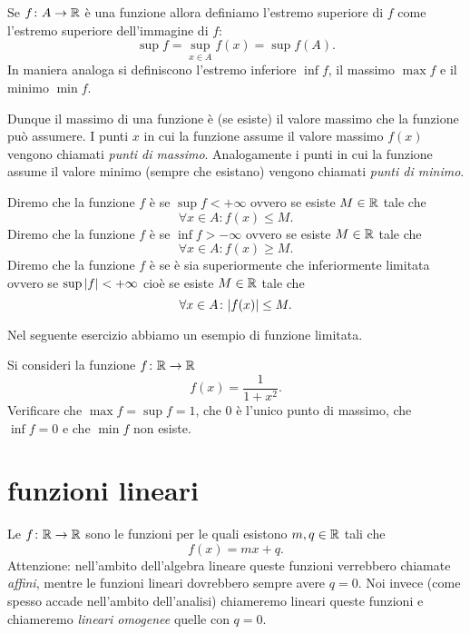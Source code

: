 \begin{definition}
Se $f\colon A \to \mathbb R$ è una funzione allora definiamo
l'estremo superiore di $f$ come l'estremo superiore
dell'immagine di $f$:
\[
  \sup f = \sup_{x\in A} f(x) = \sup f(A).
\]
In maniera analoga si definiscono l'estremo inferiore $\inf f$,
il massimo $\max f$ e il minimo $\min f$.

Dunque il massimo di una funzione è (se esiste) il valore massimo
che la funzione può assumere. I punti $x$ in cui
la funzione assume il valore massimo $f(x)$ vengono chiamati
\emph{punti di massimo}.
%
%
%
Analogamente i punti in cui la funzione
assume il valore minimo (sempre che esistano) vengono
chiamati \emph{punti di minimo}.

Diremo che la funzione $f$ è
se $\sup f<+\infty$
ovvero se esiste $M\in \mathbb R$ tale che
\[
\forall x\in A \colon f(x) \le M.
\]
Diremo che la funzione $f$ è
se $\inf f > -\infty$ ovvero se esiste $M\in \mathbb R$ tale che
\[
 \forall x \in A \colon f(x) \ge M.
\]
Diremo che la funzione $f$ è 
se è sia superiormente che inferiormente limitata ovvero
se $\sup{\left|f\right|}<+\infty$ cioè se esiste $M\in \mathbb R$ tale che
\[
\forall x \in A \colon {\left|f(x)\right|}\le M.
\]
\end{definition}

Nel seguente esercizio abbiamo un esempio di funzione limitata.
\begin{exercise}
Si consideri la funzione $f\colon \mathbb R\to\mathbb R$
\[
 f(x) = \frac{1}{1+x^2}.
\]
Verificare che $\max f = \sup f = 1$, che $0$ è l'unico punto di massimo,
che $\inf f = 0$ e che $\min f$ non esiste.
\end{exercise}

\section{funzioni lineari}

Le 
$f\colon \mathbb R \to \mathbb R$ sono le funzioni per le quali
esistono $m,q\in\mathbb R$ tali che
\[
  f(x) = mx + q.
\]
Attenzione: nell'ambito dell'algebra lineare queste
funzioni verrebbero chiamate \emph{affini}, mentre
le funzioni lineari dovrebbero sempre avere $q=0$.
Noi invece (come spesso accade nell'ambito dell'analisi)
chiameremo lineari queste funzioni e chiameremo
\emph{lineari omogenee} quelle con $q=0$.

